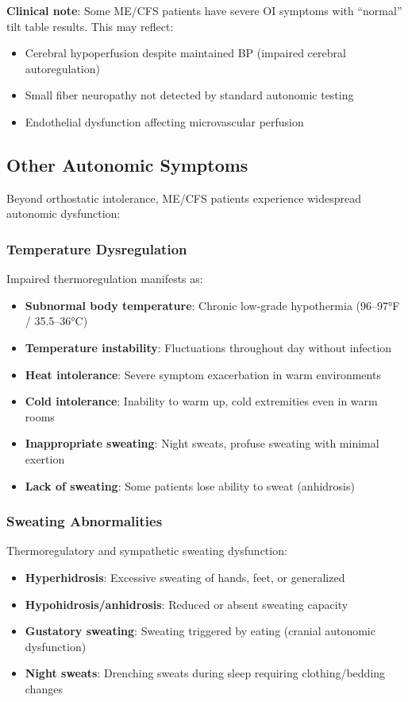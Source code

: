 \textbf{Clinical note}: Some ME/CFS patients have severe OI symptoms with ``normal'' tilt table results. This may reflect:
\begin{itemize}
    \item Cerebral hypoperfusion despite maintained BP (impaired cerebral autoregulation)
    \item Small fiber neuropathy not detected by standard autonomic testing
    \item Endothelial dysfunction affecting microvascular perfusion
\end{itemize}

\subsection{Other Autonomic Symptoms}

Beyond orthostatic intolerance, ME/CFS patients experience widespread autonomic dysfunction:

\subsubsection{Temperature Dysregulation}

Impaired thermoregulation manifests as:
\begin{itemize}
    \item \textbf{Subnormal body temperature}: Chronic low-grade hypothermia (96--97°F / 35.5--36°C)
    \item \textbf{Temperature instability}: Fluctuations throughout day without infection
    \item \textbf{Heat intolerance}: Severe symptom exacerbation in warm environments
    \item \textbf{Cold intolerance}: Inability to warm up, cold extremities even in warm rooms
    \item \textbf{Inappropriate sweating}: Night sweats, profuse sweating with minimal exertion
    \item \textbf{Lack of sweating}: Some patients lose ability to sweat (anhidrosis)
\end{itemize}

\subsubsection{Sweating Abnormalities}

Thermoregulatory and sympathetic sweating dysfunction:
\begin{itemize}
    \item \textbf{Hyperhidrosis}: Excessive sweating of hands, feet, or generalized
    \item \textbf{Hypohidrosis/anhidrosis}: Reduced or absent sweating capacity
    \item \textbf{Gustatory sweating}: Sweating triggered by eating (cranial autonomic dysfunction)
    \item \textbf{Night sweats}: Drenching sweats during sleep requiring clothing/bedding changes
\end{itemize}


